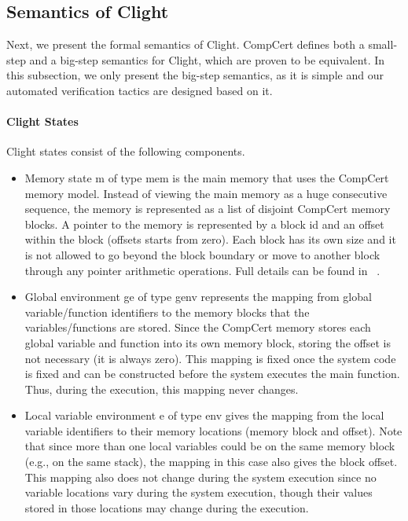 \subsection{Semantics of Clight}

Next, we present the formal semantics of Clight. CompCert defines
both a small-step and a big-step semantics for Clight, which are proven
to be equivalent. In this subsection,
we only present the big-step semantics, as it is simple and our automated
verification tactics are designed based on it.

\paragraph{Clight States}
Clight states consist of the following components.
\begin{itemize}[leftmargin=*]

\item Memory state \textsf{m} of type \textsf{mem} is the main memory
that uses the CompCert memory model. Instead of viewing the main memory
as a huge consecutive sequence, the memory is represented as a list of
disjoint CompCert memory blocks. A pointer to the memory is represented
by a block id and an offset within the block (offsets starts from zero).
Each block has its own size and it is not allowed to go beyond the block boundary
or move to another block through any pointer arithmetic operations.
Full details can be found in ~\cite{leroy08}.  

\item Global environment \textsf{ge} of type \textsf{genv} represents the mapping
from global variable/function identifiers to the memory blocks that the variables/functions
are stored. Since the CompCert memory stores each global variable and function into
its own memory block, storing the offset is not necessary (it is always zero).
This mapping is fixed once the system code is fixed and can be constructed
before the system executes the main function. Thus, during the execution, 
this mapping never changes.

\item Local variable environment \textsf{e} of type \textsf{env} gives the
mapping from the local variable identifiers to their memory locations
(memory block and offset). Note that since more than one local variables
could be on the same memory block (e.g., on the same stack), the mapping
in this case also gives the block offset. This mapping also does not change
during the system execution since no variable locations vary during the system
execution, though their values stored in those locations may change during the
execution.


\end{itemize}

